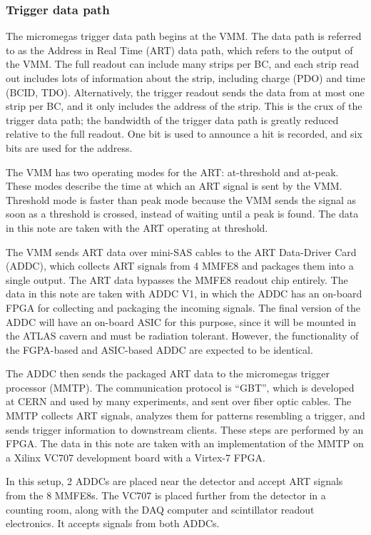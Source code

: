 \subsubsection{Trigger data path}
\label{sec:exp-art}

The micromegas trigger data path begins at the VMM. The data path is referred to as the Address in Real Time (ART) data path, which refers to the output of the VMM. The full readout can include many strips per BC, and each strip read out includes lots of information about the strip, including charge (PDO) and time (BCID, TDO). Alternatively, the trigger readout sends the data from at most one strip per BC, and it only includes the address of the strip. This is the crux of the trigger data path; the bandwidth of the trigger data path is greatly reduced relative to the full readout. One bit is used to announce a hit is recorded, and six bits are used for the address.

The VMM has two operating modes for the ART: at-threshold and at-peak. These modes describe the time at which an ART signal is sent by the VMM. Threshold mode is faster than peak mode because the VMM sends the signal as soon as a threshold is crossed, instead of waiting until a peak is found. The data in this note are taken with the ART operating at threshold.

The VMM sends ART data over mini-SAS cables to the ART Data-Driver Card (ADDC), which collects ART signals from 4 MMFE8 and packages them into a single output. The ART data bypasses the MMFE8 readout chip entirely. The data in this note are taken with ADDC V1, in which the ADDC has an on-board FPGA for collecting and packaging the incoming signals. The final version of the ADDC will have an on-board ASIC for this purpose, since it will be mounted in the ATLAS cavern and must be radiation tolerant. However, the functionality of the FGPA-based and ASIC-based ADDC are expected to be identical.

The ADDC then sends the packaged ART data to the micromegas trigger processor (MMTP). The communication protocol is ``GBT'', which is developed at CERN and used by many experiments, and sent over fiber optic cables. The MMTP collects ART signals, analyzes them for patterns resembling a trigger, and sends trigger information to downstream clients. These steps are performed by an FPGA. The data in this note are taken with an implementation of the MMTP on a Xilinx VC707 development board with a Virtex-7 FPGA.

In this setup, 2 ADDCs are placed near the detector and accept ART signals from the 8 MMFE8s. The VC707 is placed further from the detector in a counting room, along with the DAQ computer and scintillator readout electronics. It accepts signals from both ADDCs.

